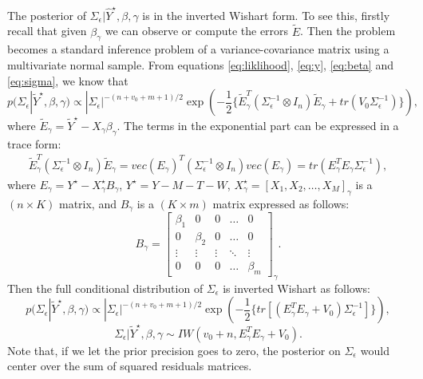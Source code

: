 \documentclass[twoside,11pt]{article}
\begin{document}
The posterior of $\Sigma_\epsilon|\hat{Y}^\star,\beta,\gamma $ is in the inverted Wishart form. To see this, firstly recall that given $\beta_\gamma$ we can observe or compute the errors $\tilde{E}$. Then the problem becomes a standard inference problem of a variance-covariance matrix using a multivariate normal sample.
From equations \eqref{eq:liklihood}, \eqref{eq:y}, \eqref{eq:beta} and \eqref{eq:sigma}, we know that
\begin{equation} \label{eq:43}
p(\Sigma_\epsilon|\tilde{Y}^\star,\beta,\gamma)\propto  |\Sigma_\epsilon|^{-(n+v_0+m+1)/2}\exp\left(-\frac{1}{2}\{\tilde{E}_\gamma^T(\Sigma_\epsilon^{-1}\otimes I_n)\tilde{E}_\gamma+tr(V_0\Sigma_\epsilon^{-1})\}\right),
\end{equation}
where $\tilde{E}_\gamma=\tilde{Y}^\star-X_\gamma \beta_\gamma$. The terms in the exponential part can be expressed in a trace form:
\begin{equation} \label{eq:44}
\begin{split}
\tilde{E}_\gamma^T(\Sigma_\epsilon^{-1}\otimes I_n)\tilde{E}_\gamma
=vec(E_\gamma)^T(\Sigma_\epsilon^{-1}\otimes I_n)vec(E_\gamma)
=tr(E_\gamma^TE_\gamma\Sigma_\epsilon^{-1}),
\end{split}
\end{equation}
where $E_\gamma=Y^\star-X^\star_\gamma B_\gamma$, $Y^\star=Y-M-T-W$,  $X_\gamma^\star=[X_1,X_2,\dots,X_M]_\gamma$ is a $(n\times K)$ matrix, and $B_\gamma$ is a $(K\times m)$ matrix expressed as follows:
\begin{equation} \label{eq:45}
B_\gamma=\begin{bmatrix}
\beta_1 & 0 & 0 & \dots  & 0 \\
0 & \beta_2 & 0 & \dots  & 0 \\
\vdots & \vdots & \vdots & \ddots & \vdots \\
0 & 0 & 0 & \dots  & \beta_{m}
\end{bmatrix}_\gamma.
\end{equation}
Then the full conditional distribution of $\Sigma_\epsilon$ is inverted Wishart as follows:
\begin{equation} \label{eq:46}
p(\Sigma_\epsilon|\tilde{Y}^\star,\beta,\gamma)\propto  |\Sigma_\epsilon|^{-(n+v_0+m+1)/2}\exp\left(-\frac{1}{2}\{tr[(E_\gamma^TE_\gamma+V_0)\Sigma_\epsilon^{-1}]\}\right),
\end{equation}
\begin{equation} \label{eq:47}
\Sigma_\epsilon|\tilde{Y}^\star,\beta,\gamma\sim IW(v_0+n,E_\gamma^TE_\gamma+V_0).
\end{equation}
Note that, if we let the prior precision goes to zero, the posterior on $\Sigma_\epsilon$  would center over the sum of squared residuals matrices.
\end{document}
